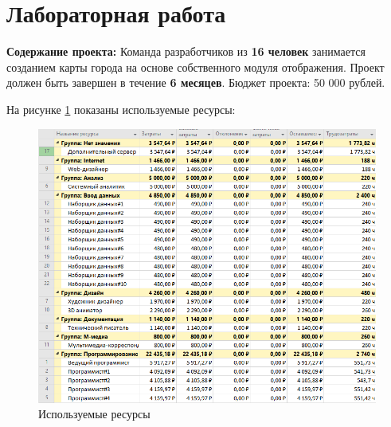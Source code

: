 \section*{Лабораторная работа}
\textbf{Содержание проекта:} Команда разработчиков из \textbf{16 человек} занимается созданием карты города на основе собственного модуля отображения. Проект должен быть завершен в течение \textbf{6 месяцев}. Бюджет проекта: 50 000 рублей.

На рисунке \ref{p0} показаны используемые ресурсы:
\begin{figure}[!h]
	\centering
	\includegraphics[width=1\linewidth]{inc/img/0.png}
	\caption{Используемые ресурсы}
	\label{p0}
\end{figure}

